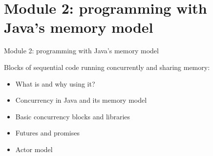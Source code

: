 \documentclass[aspectratio=169]{beamer}
\begin{document}


\section{Module 2: programming with Java's memory model}


\begin{frame}{Module 2: programming with Java's memory model}

  \vspace*{-2mm}

  \begin{block}{Blocks of sequential code running concurrently and sharing memory:}
    
  \begin{itemize}
    \item What is  and why using it?
    \item Concurrency in Java and its memory model
    \item Basic concurrency blocks and libraries
    \item Futures and promises
    \item Actor model
  \end{itemize}
  \end{block}


  \vspace*{2mm}

\end{frame}
\end{document}
